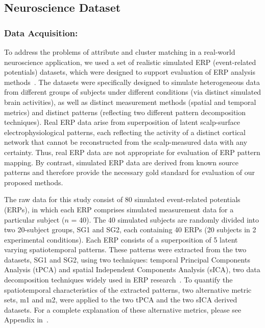 \subsection{Neuroscience Dataset}
\subsubsection{Data Acquisition:}

To address the problems of attribute and cluster matching in a real-world neuroscience application, we used a set of realistic simulated ERP (event-related potentials) datasets, which were designed to support evaluation of ERP analysis methods~\cite{FrishkoffEtal07}. The datasets were specifically designed to simulate heterogeneous data from different groups of subjects under different conditions (via distinct simulated brain activities), as well as distinct measurement methods (spatial and temporal metrics) and distinct patterns (reflecting two different pattern decomposition techniques). Real ERP data arise from superposition of latent scalp-surface electrophysiological patterns, each reflecting the activity of a distinct cortical network that cannot be reconstructed from the scalp-measured data with any certainty. Thus, real ERP data are not appropriate for evaluation of ERP pattern mapping. By contrast, simulated ERP data are derived from known source patterns and therefore provide the necessary gold standard for evaluation of our proposed methods.

The raw data for this study consist of 80 simulated event-related potentials (ERPs), in which each ERP comprises simulated measurement data for a particular subject ($n$ = 40). The 40 simulated subjects are randomly divided into two 20-subject groups, SG1 and SG2, each containing 40 ERPs (20 subjects in 2 experimental conditions). Each ERP consists of a superposition of 5 latent varying spatiotemporal patterns. These patterns were extracted from the two datasets, SG1 and SG2, using two techniques: temporal Principal Components Analysis (tPCA) and spatial Independent Components Analysis (sICA), two data decomposition techniques widely used in ERP research~\cite{Dien2010}. To quantify the spatiotemporal characteristics of the extracted patterns, two alternative metric sets, m1 and m2, were applied to the two tPCA and the two sICA derived datasets. For a complete explanation of these alternative metrics, please see Appendix in~\cite{FrishkoffEtal07}.


